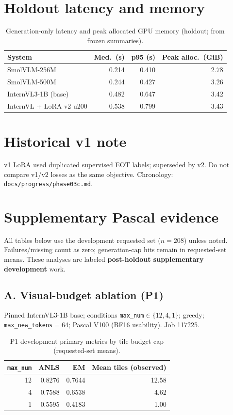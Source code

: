 \documentclass[11pt,a4paper]{article}
\begin{document}
\section{Holdout latency and memory}
\label{app:latency}

\begin{table}[H]
\centering
\caption{Generation-only latency and peak allocated GPU memory (holdout; from frozen summaries).}
\label{tab:latency}
\begin{tabular}{@{}lrrr@{}}
\toprule
System & Med.\ (s) & p95 (s) & Peak alloc.\ (GiB) \\
\midrule
SmolVLM-256M & 0.214 & 0.410 & 2.78 \\
SmolVLM-500M & 0.244 & 0.427 & 3.26 \\
InternVL3-1B (base) & 0.482 & 0.647 & 3.42 \\
InternVL + LoRA v2 u200 & 0.538 & 0.799 & 3.43 \\
\bottomrule
\end{tabular}
\end{table}

\section{Historical v1 note}
v1 LoRA used duplicated supervised EOT labels; superseded by v2.
Do not compare v1/v2 losses as the same objective.
Chronology: \texttt{docs/progress/phase03c.md}.

\section{Supplementary Pascal evidence}
\label{app:pascal}

All tables below use the development requested set ($n{=}208$) unless noted.
Failures/missing count as zero; generation-cap hits remain in requested-set means.
These analyses are labeled \textbf{post-holdout supplementary development} work.

\subsection*{A. Visual-budget ablation (P1)}
Pinned InternVL3-1B base; conditions \texttt{max\_num}${}\in\{12,4,1\}$; greedy; \texttt{max\_new\_tokens}${}={}$64; Pascal V100 (BF16 usability).
Job 117225.

\begin{table}[H]
\centering
\caption{P1 development primary metrics by tile-budget cap (requested-set means).}
\label{tab:p1}
\begin{tabular}{@{}rrrr@{}}
\toprule
\texttt{max\_num} & ANLS & EM & Mean tiles (observed) \\
\midrule
12 & 0.8276 & 0.7644 & 12.58 \\
4 & 0.7588 & 0.6538 & 4.62 \\
1 & 0.5595 & 0.4183 & 1.00 \\
\bottomrule
\end{tabular}
\end{table}
\end{document}
